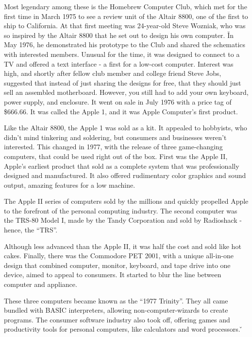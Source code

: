 Most legendary among these is the Homebrew Computer Club, which met for the first time in March 1975 to see a review
unit of the Altair 8800, one of the first to ship to California. At that first meeting was 24-year-old Steve Wozniak,
who was so inspired by the Altair 8800 that he set out to design his own computer. \v

In May 1976, he demonstrated his prototype to the Club and shared the schematics with interested members. Unusual for
the time, it was designed to connect to a TV and offered a text interface - a first for a low-cost computer. Interest
was high, and shortly after fellow club member and college friend Steve Jobs, suggested that instead of just sharing
the designs for free, that they should just sell an assembled motherboard. However, you still had to add your own
keyboard, power supply, and enclosure. It went on sale in July 1976 with a price tag of \$666.66. It was called the
Apple 1, and it was Apple Computer's first product.


Like the Altair 8800, the Apple 1 was sold as a kit. It appealed to hobbyists, who didn't mind tinkering and
soldering, but consumers and businesses weren't interested. This changed in 1977, with the release of three
game-changing computers, that could be used right out of the box. First was the Apple II, Apple's earliest product
that sold as a complete system that was professionally designed and manufactured. It also offered rudimentary color
graphics and sound output, amazing features for a low machine.


The Apple II series of computers sold by the millions and quickly propelled Apple to the forefront of the personal
computing industry. The second computer was the TRS-80 Model I, made by the Tandy Corporation and sold by Radioshack
- hence, the ``TRS''.


Although less advanced than the Apple II, it was half the cost and sold like hot cakes. Finally, there was the
Commodore PET 2001, with a unique all-in-one design that combined computer, monitor, keyboard, and tape drive into
one device, aimed to appeal to consumers. It started to blur the line between computer and appliance.


These three computers became known as the ``1977 Trinity''. They all came bundled with BASIC interpreters, allowing
non-computer-wizards to create programs. The consumer software industry also took off, offering games and
productivity tools for personal computers, like calculators and word processors. \v


